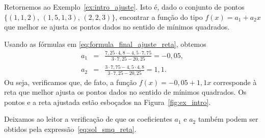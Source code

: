 \begin{ex}\label{ex:calculo_intro_ajuste}
  Retornemos ao Exemplo~\ref{ex:intro_ajuste}. Isto é, dado o conjunto de pontos $\{(1, 1,2)$, $(1,5, 1,3)$, $(2, 2,3)\}$, encontrar a função do tipo $f(x) = a_1 + a_2x$ que melhor se ajusta os pontos dados no sentido de mínimos quadrados.
\end{ex}
\begin{sol} Usando as fórmulas em \eqref{eq:formula_final_ajuste_reta}, obtemos
  \begin{eqnarray*}
    a_1&=&\frac{7,25 \cdot 4,8 - 4,5 \cdot 7,75  }{3\cdot 7,25 - 20,25 } = -0,05, \\
    a_2&=&\frac{3\cdot 7,75 - 4,5\cdot 4,8}{3\cdot 7,25 - 20,25}=1,1.
  \end{eqnarray*}
Ou seja, verificamos que, de fato, a função $f(x) = -0,05 + 1,1x$ corresponde à reta que melhor ajusta os pontos dados no sentido de mínimos quadrados. Os pontos e a reta ajustada estão esboçados na Figura~\ref{fig:ex_intro}.

Deixamos ao leitor a verificação de que os coeficientes $a_1$ e $a_2$ também podem ser obtidos pela expressão~\eqref{eq:sol_smq_reta}.


\end{sol}
